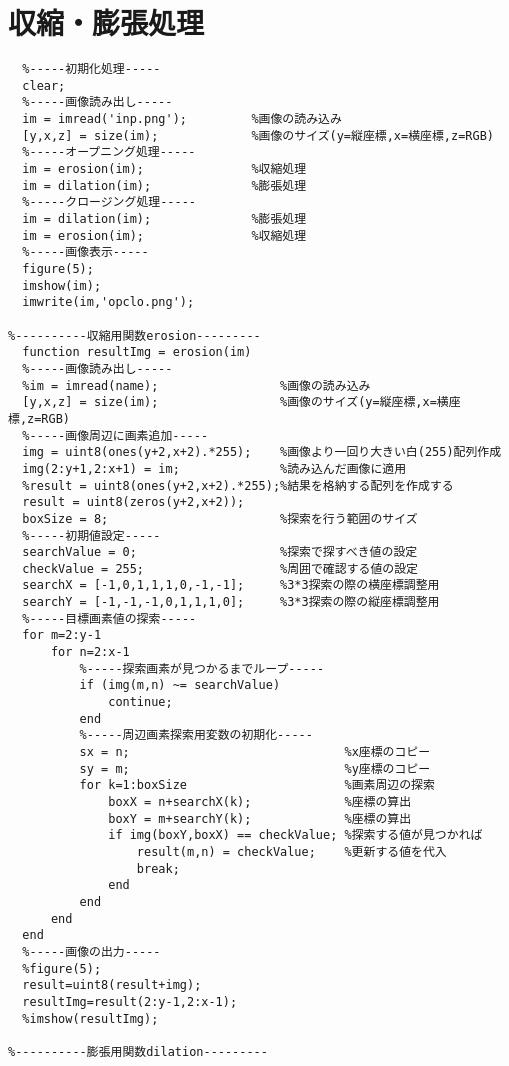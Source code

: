 \documentclass[a4j]{jarticle}
\begin{document}
\section{収縮・膨張処理}
\begin{verbatim}
  %-----初期化処理-----
  clear;
  %-----画像読み出し-----
  im = imread('inp.png');         %画像の読み込み
  [y,x,z] = size(im);             %画像のサイズ(y=縦座標,x=横座標,z=RGB)
  %-----オープニング処理-----
  im = erosion(im);               %収縮処理
  im = dilation(im);              %膨張処理
  %-----クロージング処理-----
  im = dilation(im);              %膨張処理
  im = erosion(im);               %収縮処理
  %-----画像表示-----
  figure(5);
  imshow(im);
  imwrite(im,'opclo.png');

%----------収縮用関数erosion---------
  function resultImg = erosion(im)
  %-----画像読み出し-----
  %im = imread(name);                 %画像の読み込み
  [y,x,z] = size(im);                 %画像のサイズ(y=縦座標,x=横座標,z=RGB)
  %-----画像周辺に画素追加-----
  img = uint8(ones(y+2,x+2).*255);    %画像より一回り大きい白(255)配列作成
  img(2:y+1,2:x+1) = im;              %読み込んだ画像に適用
  %result = uint8(ones(y+2,x+2).*255);%結果を格納する配列を作成する
  result = uint8(zeros(y+2,x+2));
  boxSize = 8;                        %探索を行う範囲のサイズ
  %-----初期値設定-----
  searchValue = 0;                    %探索で探すべき値の設定
  checkValue = 255;                   %周囲で確認する値の設定
  searchX = [-1,0,1,1,1,0,-1,-1];     %3*3探索の際の横座標調整用
  searchY = [-1,-1,-1,0,1,1,1,0];     %3*3探索の際の縦座標調整用
  %-----目標画素値の探索-----
  for m=2:y-1
      for n=2:x-1
          %-----探索画素が見つかるまでループ-----
          if (img(m,n) ~= searchValue)
              continue;
          end
          %-----周辺画素探索用変数の初期化-----
          sx = n;                              %x座標のコピー
          sy = m;                              %y座標のコピー
          for k=1:boxSize                      %画素周辺の探索
              boxX = n+searchX(k);             %座標の算出
              boxY = m+searchY(k);             %座標の算出
              if img(boxY,boxX) == checkValue; %探索する値が見つかれば
                  result(m,n) = checkValue;    %更新する値を代入
                  break;
              end
          end
      end
  end
  %-----画像の出力-----
  %figure(5);
  result=uint8(result+img);
  resultImg=result(2:y-1,2:x-1);
  %imshow(resultImg);

%----------膨張用関数dilation---------


\end{verbatim}
\end{document}
